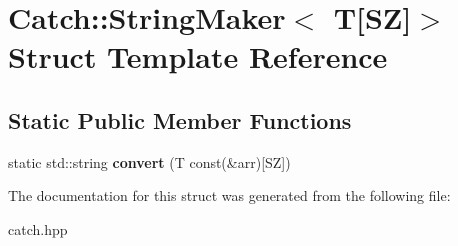 \hypertarget{structCatch_1_1StringMaker_3_01T[SZ]_4}{}\section{Catch\+::String\+Maker$<$ T\mbox{[}SZ\mbox{]}$>$ Struct Template Reference}
\label{structCatch_1_1StringMaker_3_01T[SZ]_4}
\subsection*{Static Public Member Functions}
\begin{DoxyCompactItemize}
\item 
\mbox{\label{structCatch_1_1StringMaker_3_01T[SZ]_4_a3698cea2c24d8649ec9ecb5fa679eeb7}} 
static std\+::string {\bfseries convert} (T const(\&arr)\mbox{[}SZ\mbox{]})
\end{DoxyCompactItemize}


The documentation for this struct was generated from the following file\+:\begin{DoxyCompactItemize}
\item 
catch.\+hpp\end{DoxyCompactItemize}
